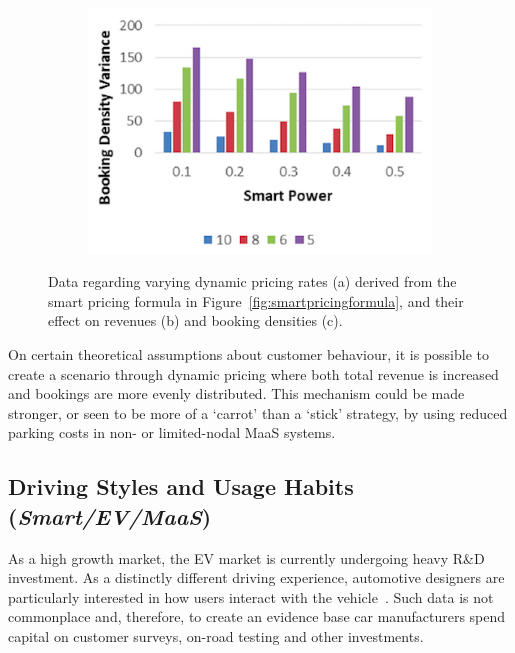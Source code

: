 \documentclass[b5paper,10pt]{article}
\begin{document}
\begin{figure}
\begin{subfigure}[b]{0.6\textwidth}
  \includegraphics[width=\textwidth]{images/smartpricegraph3.png}
        \caption{}
        \label{fig:smartbookingdensities}
\end{subfigure}
\caption{Data regarding varying dynamic pricing rates (a) derived
from the smart pricing formula in
Figure~\ref{fig:smartpricingformula}, and their effect on revenues
(b) and booking densities (c).}
\label{fig:smartpricegraphs}
\end{figure}


On certain theoretical assumptions about customer behaviour,
it is possible to create a scenario through dynamic pricing where both
total revenue is increased and bookings are more evenly
distributed. This mechanism could be made stronger, or seen to be more
of a `carrot' than a `stick' strategy, by using reduced parking costs
in non- or limited-nodal MaaS systems.

\subsection{Driving Styles and Usage Habits ({\emph{Smart/EV/MaaS}})} 

As a high growth market, the EV market is currently undergoing heavy
R\&D investment. As a distinctly different driving experience,
automotive designers are particularly interested in how users interact
with the vehicle~\citep{ferreira-et-al:2013}. Such data is not
commonplace and, therefore, to create an evidence base car
manufacturers spend capital on customer surveys, on-road testing and
other investments.
\end{document}
